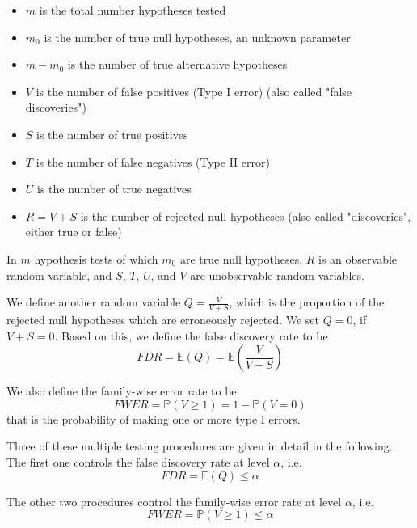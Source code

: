 \documentclass{beamer}
\begin{document}
\begin{frame}
	\begin{itemize}
		\item $m$ is the total number hypotheses tested
		\item $m_0$ is the number of true null hypotheses, an unknown parameter
		\item $m - m_0$ is the number of true alternative hypotheses
		\item $V$ is the number of false positives (Type I error) (also called "false discoveries")
		\item $S$ is the number of true positives
		\item $T$ is the number of false negatives (Type II error)
		\item $U$ is the number of true negatives
		\item $R = V + S$ is the number of rejected null hypotheses (also called "discoveries", either true or false)
	\end{itemize}
	In $m$ hypothesis tests of which $m_0$ are true null hypotheses, $R$ is an observable random variable, and $S$, $T$, $U$, and $V$ are unobservable random variables.
\end{frame}

\begin{frame}
	We define another random variable $Q = \frac{V}{V + S}$, which is the proportion of the rejected null hypotheses which are erroneously rejected. We set $Q = 0$, if $V + S = 0$. Based on this, we define the false discovery rate to be
	\begin{equation}
		FDR = \mathbb{E}(Q) = \mathbb{E} \left( \frac{V}{V + S} \right)
	\end{equation}
	
	We also define the family-wise error rate to be
	\begin{equation}
		FWER = \mathbb{P}( V \geq 1 ) = 1 - \mathbb{P}( V = 0 )
	\end{equation}
	that is the probability of making one or more type I errors.
\end{frame}

\begin{frame}
	Three of these multiple testing procedures are given in detail in the following. The first one controls the false discovery rate at level $\alpha$, i.e.
	\begin{equation}
		FDR = \mathbb{E}(Q) \leq \alpha
	\end{equation}
	
	The other two procedures control the family-wise error rate at level $\alpha$, i.e.
	\begin{equation}
		FWER = \mathbb{P}( V \geq 1 ) \leq \alpha
	\end{equation}
\end{frame}
\end{document}
